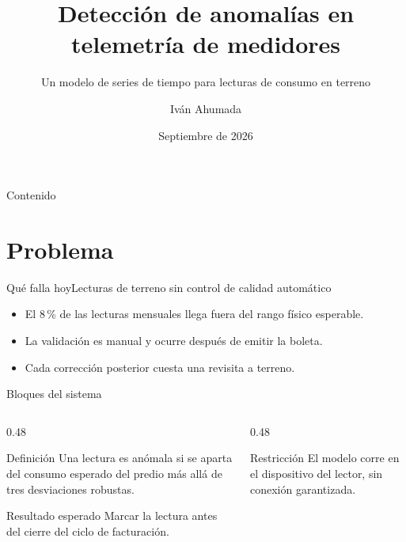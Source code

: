 \documentclass[11pt,aspectratio=169]{beamer}
\title[Anomalías en telemetría]{Detección de anomalías en telemetría de medidores}
\subtitle{Un modelo de series de tiempo para lecturas de consumo en terreno}
\author{Iván Ahumada}
\date{Septiembre de 2026}
\institute[USACH]{Universidad de Santiago de Chile}
\begin{document}
\usachportada

\begin{frame}{Contenido}
  \tableofcontents
\end{frame}

\section{Problema}

\begin{frame}{Qué falla hoy}{Lecturas de terreno sin control de calidad automático}
  \begin{itemize}\usachaire
    \item El 8\,\% de las lecturas mensuales llega fuera del rango físico esperable.
    \item La validación es manual y ocurre después de emitir la boleta.
    \item Cada corrección posterior cuesta una revisita a terreno.
  \end{itemize}

  \vfill
\end{frame}

\begin{frame}{Bloques del sistema}
  \begin{columns}[T,onlytextwidth]
    \begin{column}{0.48\textwidth}
      \begin{block}{Definición}
        Una lectura es anómala si se aparta del consumo esperado del predio más
        allá de tres desviaciones robustas.
      \end{block}
      \begin{exampleblock}{Resultado esperado}
        Marcar la lectura antes del cierre del ciclo de facturación.
      \end{exampleblock}
    \end{column}
    \begin{column}{0.48\textwidth}
      \begin{alertblock}{Restricción}
        El modelo corre en el dispositivo del lector, sin conexión garantizada.
      \end{alertblock}
    \end{column}
  \end{columns}
\end{frame}
\end{document}
